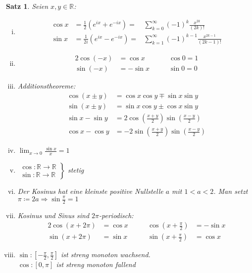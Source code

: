 \documentclass[ngerman,titlepage,twoside, parskip=half*]{scrreprt}
\newcommand*{\R}{\mathbb{R}}
\theoremstyle{break}
\newtheorem{theorem}{Satz}[section]
\theoremstyle{nonumberbreak}
\begin{document}
\begin{theorem}
Seien $x,y\in\R$:
\begin{enumerate}[(i)]
  \item \begin{align*}
    \cos x & = \frac{1}{2}(e^{ix}+e^{-ix}) =  &\sum_{k=0}^\infty (-1)^k \frac{x^{2k}}{(2k)!}\\
    \sin x & = \frac{1}{2i}(e^{ix}-e^{-ix}) =  &\sum_{k=1}^\infty (-1)^{k-1}\frac{x^{2k-1}}{(2k-1)!}
  \end{align*}
  \item \begin{alignat*}{2}
    \cos (-x) & = \cos x & \qquad \cos 0 = 1\\
    \sin (-x) & = -\sin x & \qquad \sin 0 =0
  \end{alignat*}
  \item Additionstheoreme:
  \begin{align*}
    \cos (x\pm y) & = \cos x \cos y \mp \sin x \sin y\\
    \sin (x\pm y) & = \sin x \cos y \pm \cos x \sin y\\
    \sin x - \sin y & = 2\cos (\frac{x+y}{2})\sin (\frac{x-y}{2})\\
    \cos x - \cos y & = -2\sin (\frac{x+y}{2})\sin(\frac{x-y}{2})
  \end{align*}
  \item $\lim_{x\rightarrow 0} \frac{\sin x}{x}=1$
  \item $\left.\begin{array}{rcl}
    \cos \colon\R\rightarrow\R\\
    \sin \colon \R\rightarrow\R\end{array}\right\}$ stetig
  \item Der Kosinus hat eine kleinste positive Nullstelle $a$ mit $1<a<2$. Man setzt $\pi\coloneqq2a\Rightarrow
    \sin \frac{\pi}{2}=1$
  \item Kosinus und Sinus sind $2\pi$-periodisch:
    \begin{alignat*}{2}
      \cos (x+2\pi) & = \cos x & \qquad \cos (x+\frac{\pi}{2}) & = -\sin x\\
      \sin (x+2\pi) & = \sin x & \qquad \sin (x+\frac{\pi}{2}) & = \cos x
    \end{alignat*}
  \item $\sin \colon [-\frac{\pi}{2},\frac{\pi}{2}]$ ist streng monoton wachsend.\\
    $\cos \colon [0,\pi]$ ist streng monoton fallend
\end{enumerate}
\end{theorem}
\end{document}
